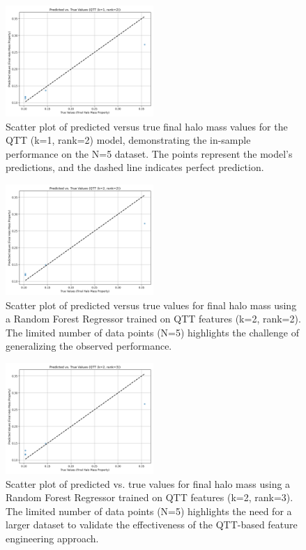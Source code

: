 \documentclass[twocolumn]{aastex631}
\begin{document}
\begin{figure}[h!]
    \centering
    \includegraphics[width=0.5\textwidth]{../input_files/plots/pred_vs_true_qtt_k1_r2_4_20250524-175150.png}
    \caption{Scatter plot of predicted versus true final halo mass values for the QTT (k=1, rank=2) model, demonstrating the in-sample performance on the N=5 dataset. The points represent the model's predictions, and the dashed line indicates perfect prediction.
}
    \label{fig:pred_vs_true_qtt_k1_r2}
\end{figure}

\begin{figure}[h!]
    \centering
    \includegraphics[width=0.5\textwidth]{../input_files/plots/pred_vs_true_qtt_k2_r2_10_20250524-175150.png}
    \caption{Scatter plot of predicted versus true values for final halo mass using a Random Forest Regressor trained on QTT features (k=2, rank=2). The limited number of data points (N=5) highlights the challenge of generalizing the observed performance.
}
    \label{fig:pred_vs_true_qtt_k2_r2}
\end{figure}

\begin{figure}[h!]
    \centering
    \includegraphics[width=0.5\textwidth]{../input_files/plots/pred_vs_true_qtt_k2_r3_13_20250524-175150.png}
    \caption{Scatter plot of predicted vs. true values for final halo mass using a Random Forest Regressor trained on QTT features (k=2, rank=3). The limited number of data points (N=5) highlights the need for a larger dataset to validate the effectiveness of the QTT-based feature engineering approach.
}
    \label{fig:pred_vs_true_qtt_k2_r3}
\end{figure}
\end{document}

